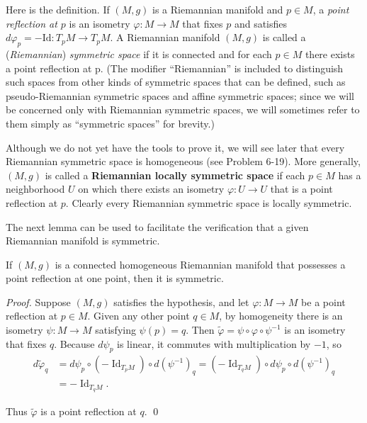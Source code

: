 Here is the definition. If $(M, g)$ is a Riemannian manifold and $p \in M$, a \emph{point reflection at $p$} is an isometry $\varphi: M \to M$ that fixes $p$ and satisfies $d\varphi_p = -\text{Id}: T_p M \to T_p M$. A Riemannian manifold $(M, g)$ is called a (\emph{Riemannian}) \emph{symmetric space} if it is connected and for each $p \in M$ there exists a point reflection at
p. (The modifier ``Riemannian'' is included to distinguish such spaces from other kinds of symmetric spaces that can be defined, such as pseudo-Riemannian symmetric spaces and affine symmetric spaces; since we will be concerned only with Riemannian symmetric spaces, we will sometimes refer to them simply as ``symmetric spaces'' for brevity.)

Although we do not yet have the tools to prove it, we will see later that every Riemannian symmetric space is homogeneous (see Problem 6-19). More generally, $(M, g)$ is called a \textbf{Riemannian locally symmetric space} if each $p \in M$ has a neighborhood $U$ on which there exists an isometry $\varphi: U \to U$ that is a point reflection at $p$. Clearly every Riemannian symmetric space is locally symmetric.

The next lemma can be used to facilitate the verification that a given Riemannian manifold is symmetric.

\begin{lemma}\label{lem:homogeneous-point-reflection-symmetric}
If $(M, g)$ is a connected homogeneous Riemannian manifold that possesses a point reflection at one point, then it is symmetric.
\end{lemma}

\begin{proof}
Suppose $(M, g)$ satisfies the hypothesis, and let $\varphi: M \to M$ be a point reflection at $p \in M$. Given any other point $q \in M$, by homogeneity there is an isometry $\psi: M \to M$ satisfying $\psi(p) = q$. Then $\tilde{\varphi} = \psi \circ \varphi \circ \psi^{-1}$ is an isometry that fixes $q$. Because $d\psi_p$ is linear, it commutes with multiplication by $-1$, so
\begin{align*}
d\tilde{\varphi}_q &= d\psi_p \circ (-\operatorname{Id}_{T_p M}) \circ d(\psi^{-1})_q = (-\operatorname{Id}_{T_q M}) \circ d\psi_p \circ d(\psi^{-1})_q \\
&= -\operatorname{Id}_{T_q M}.
\end{align*}

Thus $\tilde{\varphi}$ is a point reflection at $q$. \qed
\end{proof}

